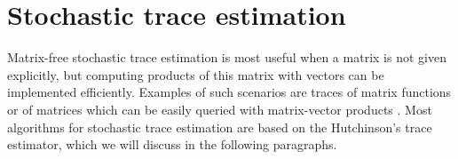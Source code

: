 \section{Stochastic trace estimation}
\label{sec:2-chebyshev-stochastic-trace-estimation}

Matrix-free stochastic trace estimation is most useful when a matrix is not given
explicitly, but computing products of this matrix with vectors can be implemented
efficiently. Examples of such scenarios are traces of matrix functions
\cite{ubaru2017lanczos,epperly2023xtrace} or of matrices which can be easily
queried with matrix-vector products \cite{ghorbani2019investigation,adepu2021hessian}.
Most algorithms for stochastic trace estimation are based on the Hutchinson's
trace estimator, which we will discuss in the following paragraphs.\\

